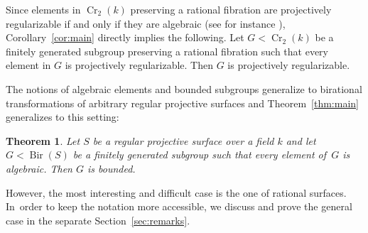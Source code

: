 \documentclass[11pt]{article}
\numberwithin{equation}{section}
\newcommand{\Bir}{\operatorname{Bir}}
\newcommand{\Cr}{\operatorname{Cr}}
\theoremstyle{plain}
\newtheorem{theorem}{Theorem}[section]
\theoremstyle{definition}
\begin{document}
Since elements in $\Cr_2(k)$ preserving a rational fibration are projectively regularizable if and only if they are algebraic {(see for instance \cite[Table\,1]{lonjou2021actions})}, Corollary~\ref{cor:main} directly implies the following.
Let $G<\Cr_2(k)$ be a finitely generated subgroup preserving a rational fibration such that every element in $G$ is projectively regularizable. Then $G$ is projectively regularizable.

The notions of algebraic elements {and bounded subgroups} generalize to birational transformations of arbitrary regular projective surfaces and Theorem~\ref{thm:main} generalizes to this setting:

\begin{theorem}\label{thm:main_general}
Let $S$ be a regular projective surface over a field $k$ and let $G <\Bir(S)$ be a finitely generated subgroup such that every element of~$G$ is algebraic. Then $G$ is {bounded}.
\end{theorem}

However, the most interesting and difficult case is the one of rational surfaces. In~order to keep the notation more accessible, we discuss and prove the general case in the separate Section~\ref{sec:remarks}.
\end{document}
